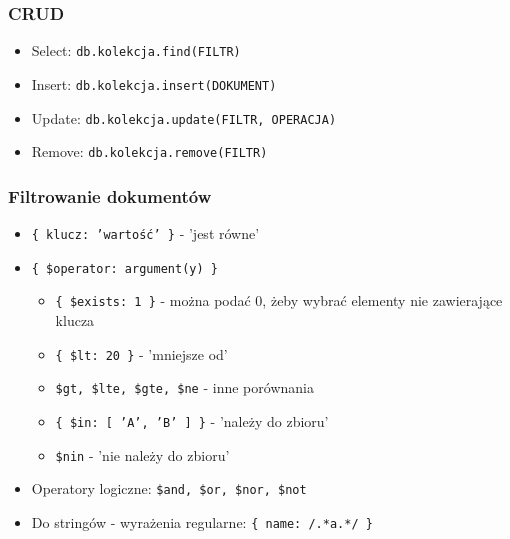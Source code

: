 \documentclass{beamer}
\begin{document}
  \begin{frame}
    \frametitle{CRUD}
    \begin{itemize}
      \item Select: \texttt{db.kolekcja.find(FILTR)}
      
      \item Insert: \texttt{db.kolekcja.insert(DOKUMENT)}
      
      \item Update: \texttt{db.kolekcja.update(FILTR, OPERACJA)}
      
      \item Remove: \texttt{db.kolekcja.remove(FILTR)}
      
    \end{itemize}
  \end{frame}

  \begin{frame}
    \frametitle{Filtrowanie dokumentów}
    \begin{itemize}
      \item \texttt{\{ klucz: 'wartość' \}} - 'jest równe'
      \item \texttt{\{ \$operator: argument(y) \}}
      \begin{itemize}
        \item \texttt{\{ \$exists: 1 \}} - można podać 0, żeby wybrać elementy nie zawierające klucza
        \item \texttt{\{ \$lt: 20 \}} - 'mniejsze od'
        \item \texttt{\$gt, \$lte, \$gte, \$ne} - inne porównania
        \item \texttt{\{ \$in: [ 'A', 'B' ] \}} - 'należy do zbioru'
        \item \texttt{\$nin} - 'nie należy do zbioru'
      \end{itemize}
      \item Operatory logiczne: \texttt{\$and, \$or, \$nor, \$not}
      \item Do stringów - wyrażenia regularne: \texttt{\{ name: /.*a.*/ \}}
    \end{itemize}
    
  \end{frame}
\end{document}
